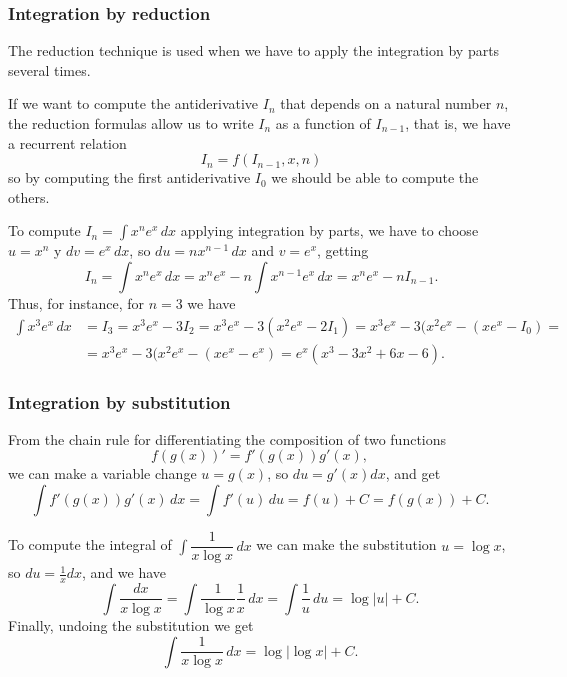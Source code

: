 \begin{frame}
\frametitle{Integration by reduction}
The reduction technique is used when we have to apply the integration by parts several times. 

If we want to compute the antiderivative $I_{n}$ that depends on a natural number $n$, the reduction formulas allow us to write $I_{n}$ as a function of $I_{n-1}$, that is, we have a recurrent relation
\[
\ I_{n}=f(I_{n-1},x,n)
\]
so by computing the first antiderivative $I_0$ we should be able to compute the others.

 To compute $I_{n}=\int{x^ne^x}\,dx$ applying integration by parts, we have to choose $u=x^n$ y $dv=e^x\,dx$, so $du=nx^{n-1}\,dx$ and $v=e^{x}$, getting
\[
\ I_{n}=\int{x^ne^x}\,dx=x^ne^x-n\int{x^{n-1}e^x}\,dx=x^ne^x-nI_{n-1}.
\]
Thus, for instance, for $n=3$ we have
\begin{align*}
\int x^3 e^x\, dx &= I_3 = x^3e^x-3I_2 = x^3e^x-3(x^2e^x-2I_1) = x^3e^x-3(x^2e^x-(xe^x-I_0) =\\
&= x^3e^x-3(x^2e^x-(xe^x-e^x) = e^x(x^3-3x^2+6x-6).
\end{align*}
\end{frame}


\begin{frame}
\frametitle{Integration by substitution}
From the chain rule for differentiating the composition of two functions 
\[
f(g(x))' = f'(g(x))g'(x),
\]
we can make a variable change $u=g(x)$, so $du=g'(x)dx$, and get
\[
\int f'(g(x))g'(x)\, dx = \int f'(u)\, du = f(u)+C = f(g(x))+C.
\]

 To compute the integral of $\int{\dfrac{1}{x\log x}}\, dx$ we can make the substitution 
$u=\log x$, so $du=\frac{1}{x}dx$, and we have
\[
\int \frac{dx}{x\log x}=\int \frac{1}{\log x}\frac{1}{x}\,dx = \int \frac{1}{u}\,du = \log |u|+ C.
\]
Finally, undoing the substitution we get 
\[
\int \frac{1}{x\log x}\,dx= \log |\log x| + C.
\]
\end{frame}


